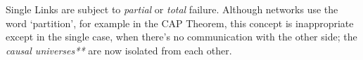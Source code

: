 \documentclass[../../../OAE-SPEC-MAIN.tex]{subfiles}
\begin{document}
Single Links are subject to \emph{partial} or \emph{total} failure. Although networks use the word  `partition', for example in the CAP Theorem\cite{CAP}, this concept is inappropriate except in the single \LINK case, when there's no communication with the other side; the  \emph{causal %
 universes**} are now isolated from each other.
 
 
 
 
\end{document}
